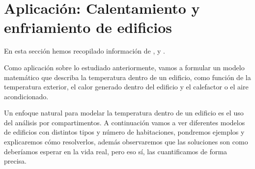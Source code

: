 \chapter{Aplicación: Calentamiento y enfriamiento de edificios}
En esta sección hemos recopilado información de \cite{Campos}, \cite{Nagle} y \cite{tfm}.

Como aplicación sobre lo estudiado anteriormente, vamos a formular un modelo matemático que describa la temperatura dentro de un edificio, como función de la temperatura exterior, el calor generado dentro del edificio y el calefactor o el aire acondicionado.

Un enfoque natural para modelar la temperatura dentro de un edificio es el uso del análisis por compartimentos. A continuación vamos a ver diferentes modelos de edificios con distintos tipos y número de habitaciones, pondremos ejemplos y explicaremos cómo resolverlos, además observaremos que las soluciones son como deberíamos esperar en la vida real, pero eso sí, las cuantificamos de forma precisa.
